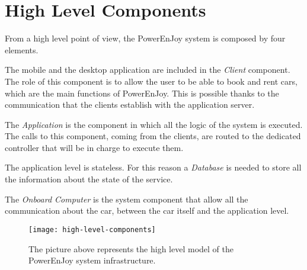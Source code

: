 \section{High Level Components}
From a high level point of view, the PowerEnJoy system is composed by four elements.

The mobile and the desktop application are included in the \textit{Client} component. The role of this component is to allow the user to be able to book and rent cars, which are the main functions of PowerEnJoy. This is possible thanks to the communication that the clients establish with the application server.

The \textit{Application} is the component in which all the logic of the system is executed. The calls to this component, coming from the clients, are routed to the dedicated controller that will be in charge to execute them.

The application level is stateless. For this reason a \textit{Database} is needed to store all the information about the state of the service.

The \textit{Onboard Computer} is the system component that allow all the communication about the car, between the car itself and the application level.

\begin{figure}[H]
	\centering
	\texttt{[image: high-level-components]}
	\caption[High Level Components]{The picture above represents the high level model of the PowerEnJoy system infrastructure.}
	\label{fig:high-level-components}
\end{figure}
